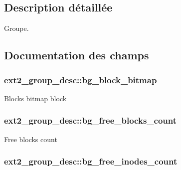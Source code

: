 \subsection{Description détaillée}
Groupe. 

\subsection{Documentation des champs}
\hypertarget{structext2__group__desc_a57481ebe34986e28812cc9b4e122c016}{
\subsubsection[{bg\+\_\+block\+\_\+bitmap}]{ ext2\+\_\+group\+\_\+desc\+::bg\+\_\+block\+\_\+bitmap}}\label{structext2__group__desc_a57481ebe34986e28812cc9b4e122c016}
Blocks bitmap block \hypertarget{structext2__group__desc_af1cf7574780c76da67e973179f6edd43}{
\subsubsection[{bg\+\_\+free\+\_\+blocks\+\_\+count}]{ ext2\+\_\+group\+\_\+desc\+::bg\+\_\+free\+\_\+blocks\+\_\+count}}\label{structext2__group__desc_af1cf7574780c76da67e973179f6edd43}
Free blocks count \hypertarget{structext2__group__desc_a5488cd2eb4ea863ca9d15a5df8da6bab}{
\subsubsection[{bg\+\_\+free\+\_\+inodes\+\_\+count}]{ ext2\+\_\+group\+\_\+desc\+::bg\+\_\+free\+\_\+inodes\+\_\+count}}\label{structext2__group__desc_a5488cd2eb4ea863ca9d15a5df8da6bab}
